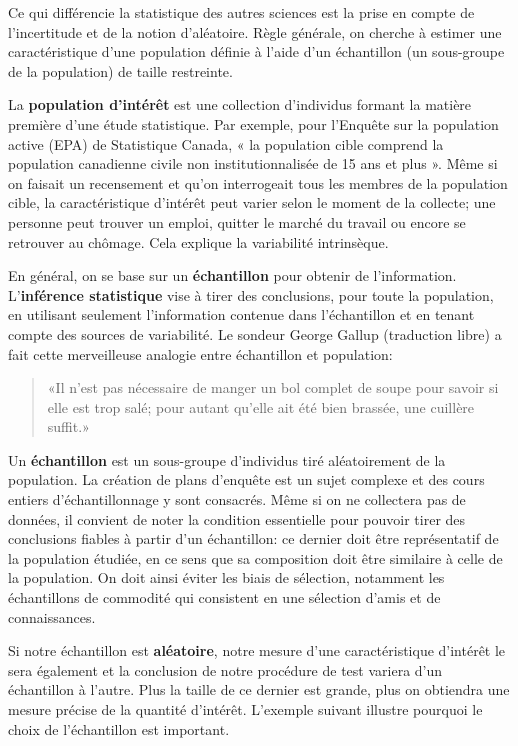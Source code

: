 \documentclass[
  11pt,
  letterpaper,
]{book}
\theoremstyle{definition}
\theoremstyle{definition}
\theoremstyle{definition}
\theoremstyle{remark}
\begin{document}
Ce qui différencie la statistique des autres sciences est la prise en compte de l'incertitude et de la notion d'aléatoire. Règle générale, on cherche à estimer une caractéristique d'une population définie à l'aide d'un échantillon (un sous-groupe de la population) de taille restreinte.

La \textbf{population d'intérêt} est une collection d'individus formant la matière première d'une étude statistique. Par exemple, pour l'Enquête sur la population active (EPA) de Statistique Canada, « la population cible comprend la population canadienne civile non institutionnalisée de 15 ans et plus ». Même si on faisait un recensement et qu'on interrogeait tous les membres de la population cible, la caractéristique d'intérêt peut varier selon le moment de la collecte; une personne peut trouver un emploi, quitter le marché du travail ou encore se retrouver au chômage. Cela explique la variabilité intrinsèque.

En général, on se base sur un \textbf{échantillon} pour obtenir de l'information. L'\textbf{inférence statistique} vise à tirer des conclusions, pour toute la population, en utilisant seulement l'information contenue dans l'échantillon et en tenant compte des sources de variabilité. Le sondeur George Gallup (traduction libre) a fait cette merveilleuse analogie entre échantillon et population:

\begin{quote}
«Il n'est pas nécessaire de manger un bol complet de soupe pour savoir si elle est trop salé; pour autant qu'elle ait été bien brassée, une cuillère suffit.»
\end{quote}

Un \textbf{échantillon} est un sous-groupe d'individus tiré aléatoirement de la population. La création de plans d'enquête est un sujet complexe et des cours entiers d'échantillonnage y sont consacrés. Même si on ne collectera pas de données, il convient de noter la condition essentielle pour pouvoir tirer des conclusions fiables à partir d'un échantillon: ce dernier doit être représentatif de la population étudiée, en ce sens que sa composition doit être similaire à celle de la population. On doit ainsi éviter les biais de sélection, notamment les échantillons de commodité qui consistent en une sélection d'amis et de connaissances.

Si notre échantillon est \textbf{aléatoire}, notre mesure d'une caractéristique d'intérêt le sera également et la conclusion de notre procédure de test variera d'un échantillon à l'autre. Plus la taille de ce dernier est grande, plus on obtiendra une mesure précise de la quantité d'intérêt. L'exemple suivant illustre pourquoi le choix de l'échantillon est important.
\end{document}
